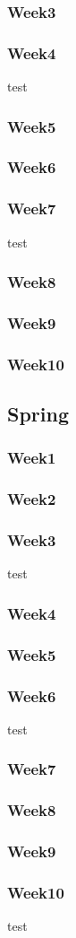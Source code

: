 	\subsubsection*{Week3}
	\subsubsection*{Week4}
		test
	\subsubsection*{Week5}
	\subsubsection*{Week6}
	\subsubsection*{Week7}
		test
	\subsubsection*{Week8}
	\subsubsection*{Week9}
	\subsubsection*{Week10}

\subsection*{Spring}
	\subsubsection*{Week1}
	\subsubsection*{Week2}
	\subsubsection*{Week3}
		test
	\subsubsection*{Week4}
	\subsubsection*{Week5}
	\subsubsection*{Week6}
		test
	\subsubsection*{Week7}
	\subsubsection*{Week8}
	\subsubsection*{Week9}
	\subsubsection*{Week10}
		test